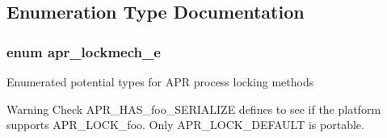 \subsection{Enumeration Type Documentation}
\subsubsection[{\texorpdfstring{apr\+\_\+lockmech\+\_\+e}{apr_lockmech_e}}]{\setlength{\rightskip}{0pt plus 5cm}enum {\bf apr\+\_\+lockmech\+\_\+e}}\hypertarget{group__apr__proc__mutex_ga75dd95a48a1e855a87b509b522746ed4}{}\label{group__apr__proc__mutex_ga75dd95a48a1e855a87b509b522746ed4}
Enumerated potential types for A\+PR process locking methods \begin{DoxyWarning}{Warning}
Check A\+P\+R\+\_\+\+H\+A\+S\+\_\+foo\+\_\+\+S\+E\+R\+I\+A\+L\+I\+ZE defines to see if the platform supports A\+P\+R\+\_\+\+L\+O\+C\+K\+\_\+foo. Only A\+P\+R\+\_\+\+L\+O\+C\+K\+\_\+\+D\+E\+F\+A\+U\+LT is portable. 
\end{DoxyWarning}
